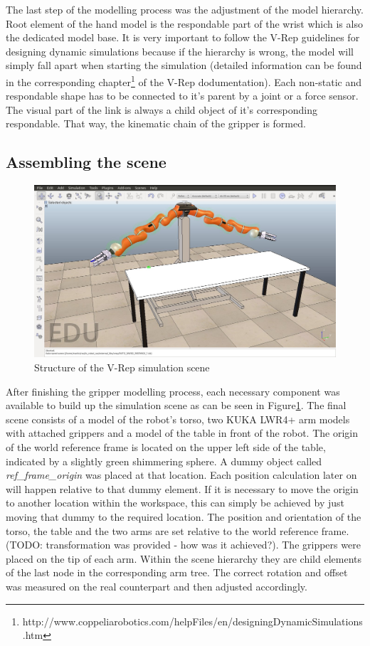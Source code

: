 The last step of the modelling process was the adjustment of the model hierarchy. Root element of the hand model is the respondable part of the wrist which is also the dedicated model base. It is very important to follow the V-Rep guidelines for designing dynamic simulations because if the hierarchy is wrong, the model will simply fall apart when starting the simulation (detailed information can be found in the corresponding chapter\footnote{http://www.coppeliarobotics.com/helpFiles/en/designingDynamicSimulations.htm} of the V-Rep dodumentation). Each non-static and respondable shape has to be connected to it's parent by a joint or a force sensor. The visual part of the link is always a child object of it's corresponding respondable. That way, the kinematic chain of the gripper is formed.


\subsection{Assembling the scene}

\begin{figure}[ht]
	\centering
  	\includegraphics[width=1.0\textwidth]{images/simulation_scene.jpg}
	\caption{Structure of the V-Rep simulation scene}
	\label{fig:sim_scene}
\end{figure}

After finishing the gripper modelling process, each necessary component was available to build up the simulation scene as can be seen in Figure\ref{fig:sim_scene}. The final scene consists of a model of the robot's torso, two KUKA LWR4+ arm models with attached grippers and a model of the table in front of the robot. The origin of the world reference frame is located on the upper left side of the table, indicated by a slightly green shimmering sphere. A dummy object called \emph{ref\_frame\_origin} was placed at that location. Each position calculation later on will happen relative to that dummy element. If it is necessary to move the origin to another location within the workspace, this can simply be achieved by just moving that dummy to the required location. The position and orientation of the torso, the table and the two arms are set relative to the world reference frame. (TODO: transformation was provided - how was it achieved?). The grippers were placed on the tip of each arm. Within the scene hierarchy they are child elements of the last node in the corresponding arm tree. The correct rotation and offset was measured on the real counterpart and then adjusted accordingly. \\

